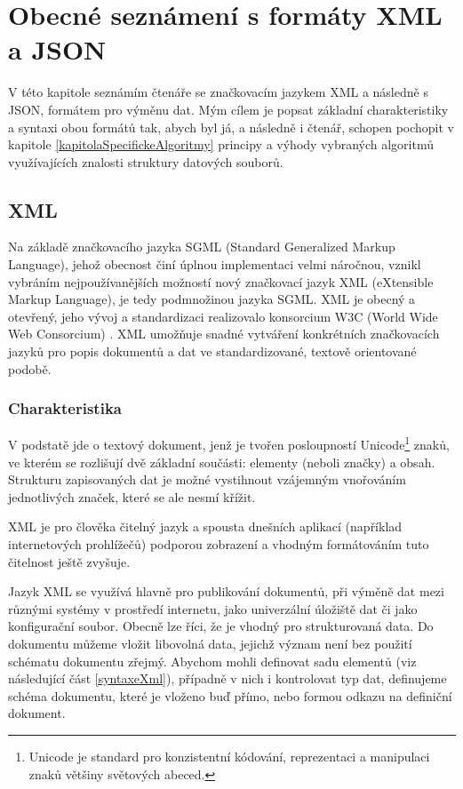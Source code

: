 \chapter{Obecné seznámení s formáty XML a JSON}
V této kapitole seznámím čtenáře se značkovacím jazykem XML a následně s JSON, formátem pro výměnu dat. Mým cílem je popsat základní charakteristiky a syntaxi obou formátů tak, abych byl já, a následně i čtenář, schopen pochopit v kapitole \ref{kapitolaSpecifickeAlgoritmy} principy a výhody vybraných algoritmů využívajících znalosti struktury datových souborů.

\section{XML}
Na základě značkovacího jazyka SGML (Standard Generalized Markup Language), jehož obecnost činí úplnou implementaci velmi náročnou, vznikl vybráním nejpoužívanějších možností nový značkovací jazyk XML (eXtensible Markup Language), je tedy podmnožinou jazyka SGML. XML je obecný a otevřený, jeho vývoj a standardizaci realizovalo konsorcium W3C (World Wide Web Consorcium) \cite{w3cxml}. XML umožňuje snadné vytváření konkrétních značkovacích jazyků pro popis dokumentů a dat ve standardizované, textově orientované podobě.

\subsection{Charakteristika}
V podstatě jde o textový dokument, jenž je tvořen posloupností Unicode\footnote{Unicode je standard pro konzistentní kódování, reprezentaci a manipulaci znaků většiny světových abeced.} znaků, ve kterém se rozlišují dvě základní součásti: elementy (neboli značky) a obsah. Strukturu zapisovaných dat je možné vystihnout vzájemným vnořováním jednotlivých značek, které se ale nesmí křížit.

XML je pro člověka čitelný jazyk a spousta dnešních aplikací (například internetových prohlížečů) podporou zobrazení a vhodným formátováním tuto čitelnost ještě zvyšuje.

Jazyk XML se využívá hlavně pro publikování dokumentů, při výměně dat mezi různými systémy v prostředí internetu, jako univerzální úložiště dat či jako konfigurační soubor. Obecně lze říci, že je vhodný pro strukturovaná data. Do dokumentu můžeme vložit libovolná data, jejichž význam není bez použití schématu dokumentu zřejmý. Abychom mohli definovat sadu elementů (viz následující část \ref{syntaxeXml}), případně v nich i kontrolovat typ dat, definujeme schéma dokumentu, které je vloženo buď přímo, nebo formou odkazu na definiční dokument.

